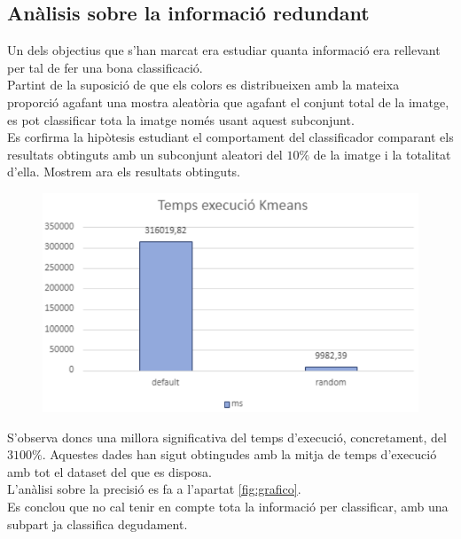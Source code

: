 \documentclass[a4paper, 11pt]{article}
\begin{document}
\subsection{Anàlisis sobre la informació redundant}
Un dels objectius que s'han marcat era estudiar quanta informació era rellevant per tal de fer una bona classificació.\\
Partint de la suposició de que els colors es distribueixen amb la mateixa proporció agafant una mostra aleatòria que agafant el conjunt total de la imatge, es pot classificar tota la imatge només usant aquest subconjunt.\\
Es corfirma la hipòtesis estudiant el comportament del classificador comparant els resultats obtinguts amb un subconjunt aleatori del $10\%$ de la imatge i la totalitat d'ella. Mostrem ara els resultats obtinguts.
\begin{figure}[h!]
\centering
\includegraphics[scale=0.6]{temps_execucio_kmeans.PNG}
\end{figure}
S'observa doncs una millora significativa del temps d'execució, concretament, del $3100\%$. Aquestes dades han sigut obtingudes amb la mitja de temps d'execució amb tot el dataset del que es disposa.\\
L'anàlisi sobre la precisió es fa a l'apartat \textcolor{blue}{\ref{fig:grafico}}.\\
Es conclou que no cal tenir en compte tota la informació per classificar, amb una subpart ja classifica degudament.
\newpage
\end{document}
